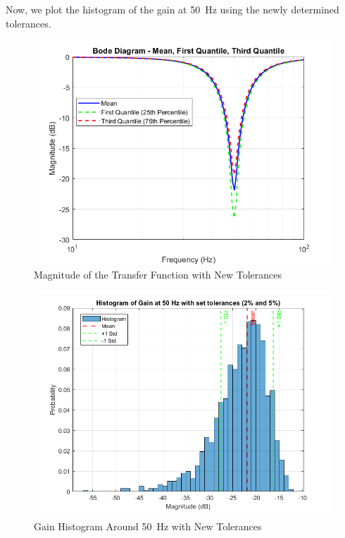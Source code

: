 \documentclass[hidelinks,12pt]{article}
\begin{document}
	
	\pagebreak


	Now, we plot the histogram of the gain at 50~Hz using the newly determined tolerances.
	
	\begin{figure}[h!]
		\centering
		\includegraphics[scale=0.6]{figures/new_tolerances/bode.png}
		\caption{Magnitude of the Transfer Function with New Tolerances}
	\end{figure}
	
	\begin{figure}[h!]
		\centering
		\includegraphics[scale=0.5]{figures/new_tolerances/histogram.png}
		\caption{Gain Histogram Around 50~Hz with New Tolerances}
	\end{figure}
\end{document}
